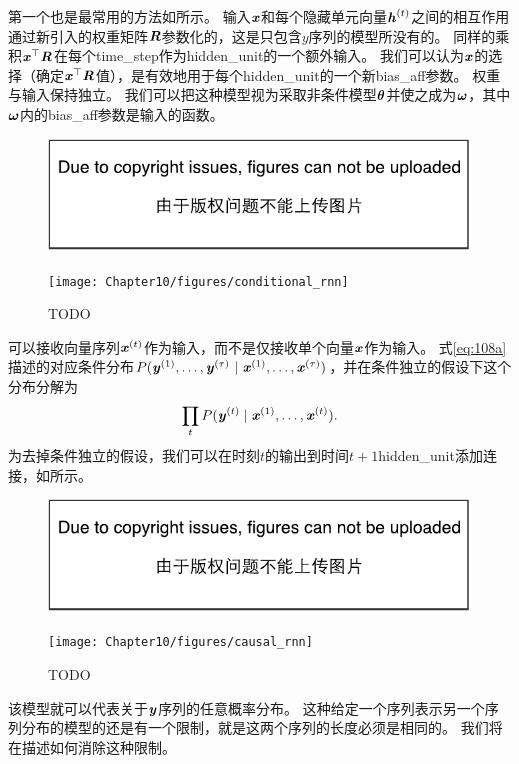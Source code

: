 第一个也是最常用的方法如所示。
输入$\boldsymbol{\mathit{x}}$和每个隐藏单元向量$\boldsymbol{\mathit{h}}^{(t)}$之间的相互作用通过新引入的权重矩阵$\boldsymbol{\mathit{R}}$参数化的，这是只包含$y$序列的模型所没有的。
同样的乘积$\boldsymbol{\mathit{x}}^\top\boldsymbol{\mathit{R}}$在每个\gls{time_step}作为\gls{hidden_unit}的一个额外输入。
我们可以认为$\boldsymbol{\mathit{x}}$的选择（确定$\boldsymbol{\mathit{x}}^\top\boldsymbol{\mathit{R}}$值），是有效地用于每个\gls{hidden_unit}的一个新\gls{bias_aff}参数。
权重与输入保持独立。
我们可以把这种模型视为采取非条件模型$\boldsymbol{\theta}$并使之成为$\boldsymbol{\omega}$，其中$\boldsymbol{\omega}$内的\gls{bias_aff}参数是输入的函数。

\begin{figure}[!htb]
\ifOpenSource
\centerline{\includegraphics{figure.pdf}}
\else
\centerline{\texttt{[image: Chapter10/figures/conditional\_rnn]}}
\fi
\caption{TODO}
\label{fig:chap10_conditional_rnn}
\end{figure}


可以接收向量序列$\boldsymbol{\mathit{x}}^{(t)}$作为输入，而不是仅接收单个向量$\boldsymbol{\mathit{x}}$作为输入。
式\eqref{eq:108a}描述的对应条件分布$P(\boldsymbol{\mathit{y}}^{(1)}, \dots, \boldsymbol{\mathit{y}}^{(\tau)} ~|~ \boldsymbol{\mathit{x}}^{(1)}, \dots, \boldsymbol{\mathit{x}}^{(\tau)})$，并在条件独立的假设下这个分布分解为
\begin{align}
 \prod_t P(\boldsymbol{\mathit{y}}^{(t)} \mid \boldsymbol{\mathit{x}}^{(1)}, \dots, \boldsymbol{\mathit{x}}^{(t)}).
\end{align}
为去掉条件独立的假设，我们可以在时刻$t$的输出到时间$t+1$\gls{hidden_unit}添加连接，如所示。
\begin{figure}[!htb]
\ifOpenSource
\centerline{\includegraphics{figure.pdf}}
\else
\centerline{\texttt{[image: Chapter10/figures/causal\_rnn]}}
\fi
\caption{TODO}
\label{fig:chap10_causal_rnn}
\end{figure}
该模型就可以代表关于$\boldsymbol{\mathit{y}}$序列的任意概率分布。
这种给定一个序列表示另一个序列分布的模型的还是有一个限制，就是这两个序列的长度必须是相同的。
我们将在描述如何消除这种限制。

